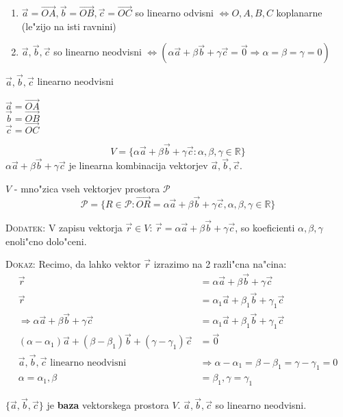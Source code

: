 \begin{enumerate}
	\item \(\vec{a} = \vec{OA}, \vec{b} = \vec{OB}, \vec{c} = \vec{OC}\) so linearno odvisni \(\Leftrightarrow O, A, B, C\) koplanarne (le"zijo na isti ravnini)
	\item \(\vec{a}, \vec{b}, \vec{c}\) so linearno neodvisni \(\Leftrightarrow (\alpha \vec{a} + \beta \vec{b} + \gamma \vec{c} = \vec{0} \Rightarrow \alpha = \beta = \gamma = 0)\)
\end{enumerate}

\(\vec{a}, \vec{b}, \vec{c}\) linearno neodvisni

\(\vec{a} = \vec{OA}\)\\
\(\vec{b} = \vec{OB}\)\\
\(\vec{c} = \vec{OC}\)

\[V = \{\alpha \vec{a} + \beta \vec{b} + \gamma \vec{c}: \alpha, \beta, \gamma \in \mathbb{R}\}\]
\(\alpha \vec{a} + \beta \vec{b} + \gamma \vec{c}\) je linearna kombinacija vektorjev \(\vec{a}, \vec{b}, \vec{c}\).

\(V\) - mno"zica vseh vektorjev prostora \(\mathcal{P}\)
\[\mathcal{P} = \{R \in \mathcal{P}: \vec{OR} = \alpha \vec{a} + \beta \vec{b} + \gamma \vec{c}, \alpha, \beta, \gamma \in \mathbb{R}\}\]

\textsc{Dodatek:} V zapisu vektorja \(\vec{r} \in V\): \(\vec{r} = \alpha \vec{a} + \beta \vec{b} + \gamma \vec{c}\), so koeficienti \(\alpha, \beta, \gamma\) enoli"cno dolo"ceni.

\textsc{Dokaz:}
Recimo, da lahko vektor $\vec{r}$ izrazimo na 2 razli"cna na"cina:
\begin{align*}
	\vec{r} &= \alpha \vec{a} + \beta \vec{b} + \gamma \vec{c}\\
	\vec{r} &= \alpha_1 \vec{a} + \beta_1 \vec{b} + \gamma_1 \vec{c}\\
	\Rightarrow \alpha \vec{a} + \beta \vec{b} + \gamma \vec{c} &= \alpha_1 \vec{a} + \beta_1 \vec{b} + \gamma_1 \vec{c}\\
	(\alpha - \alpha_1)\vec{a} + (\beta - \beta_1)\vec{b} + (\gamma - \gamma_1)\vec{c} &= \vec{0}\\
	\vec{a}, \vec{b}, \vec{c} \text{ linearno neodvisni } &\Rightarrow \alpha - \alpha_1 = \beta - \beta_1 = \gamma - \gamma_1 = 0\\
	\alpha = \alpha_1, \beta &= \beta_1, \gamma = \gamma_1
\end{align*}

\(\{\vec{a}, \vec{b}, \vec{c}\}\) je \textbf{baza} vektorskega prostora \(V\). \(\vec{a}, \vec{b}, \vec{c}\) so linearno neodvisni.

